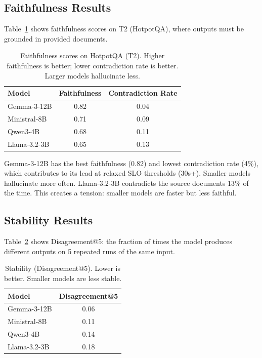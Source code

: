 \documentclass[11pt]{article}
\begin{document}
\subsection{Faithfulness Results}

Table~\ref{tab:faithfulness} shows faithfulness scores on T2 (HotpotQA), where outputs must be grounded in provided documents.

\begin{table}[t]
\centering
\caption{Faithfulness scores on HotpotQA (T2).  Higher faithfulness is better; lower contradiction rate is better.  Larger models hallucinate less.}
\label{tab:faithfulness}
\begin{tabular}{lcc}
\toprule
\textbf{Model} & \textbf{Faithfulness} & \textbf{Contradiction Rate} \\
\midrule
Gemma-3-12B & 0.82 & 0.04 \\
Ministral-8B & 0.71 & 0.09 \\
Qwen3-4B & 0.68 & 0.11 \\
Llama-3.2-3B & 0.65 & 0.13 \\
\bottomrule
\end{tabular}
\end{table}

Gemma-3-12B has the best faithfulness (0.82) and lowest contradiction rate (4\%), which contributes to its lead at relaxed SLO thresholds (30s+).
Smaller models hallucinate more often.  Llama-3.2-3B contradicts the source documents 13\% of the time.
This creates a tension: smaller models are faster but less faithful.

\subsection{Stability Results}

Table~\ref{tab:stability} shows Disagreement@5: the fraction of times the model produces different outputs on 5 repeated runs of the same input.

\begin{table}[t]
\centering
\caption{Stability (Disagreement@5).  Lower is better.  Smaller models are less stable.}
\label{tab:stability}
\begin{tabular}{lc}
\toprule
\textbf{Model} & \textbf{Disagreement@5} \\
\midrule
Gemma-3-12B & 0.06 \\
Ministral-8B & 0.11 \\
Qwen3-4B & 0.14 \\
Llama-3.2-3B & 0.18 \\
\bottomrule
\end{tabular}
\end{table}
\end{document}
